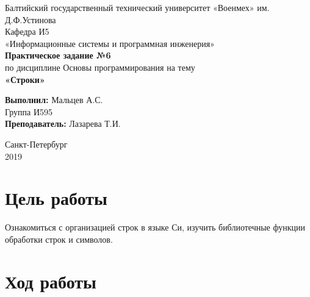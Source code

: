 \documentclass[a4paper,14pt]{extarticle}
\begin{document}
\begin{titlepage}
\centering
\small Балтийский государственный технический университет «Военмех» им. Д.Ф.Устинова \\
\vspace{3cm}
\normalsize Кафедра И5\\
«Информационные системы и программная инженерия»\\
\vspace{3cm}
\textbf{Практическое задание №6}\\
по дисциплине Основы программирования на тему\\ 
\textbf{«Строки»}\\
\vfill

\begin{flushleft}
\textbf{Выполнил:}
\hfill {Мальцев А.С.} \\
\hfill {Группа И595} \\
\vspace{1cm}
\textbf{Преподаватель:}
\hfill {Лазарева Т.И.} \\
\end{flushleft}
\vspace{3cm}

{\centering Санкт-Петербург \\
\vspace{0.15cm}
2019}
\end{titlepage}
\setcounter{page}{2}
\section{Цель работы}
Ознакомиться с организацией строк в языке Си, изучить библиотечные функции обработки строк и символов.

\section{Ход работы}
\end{document}
